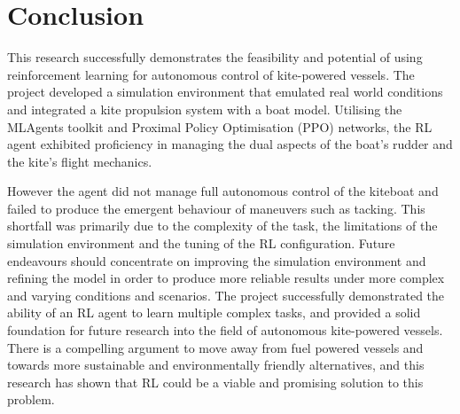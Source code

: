 \section{Conclusion}
This research successfully demonstrates the feasibility and potential of using reinforcement learning for autonomous control of kite-powered vessels. The project developed a simulation environment that emulated real world conditions and integrated a kite propulsion system with a boat model. Utilising the MLAgents toolkit and Proximal Policy Optimisation (PPO) networks, the RL agent exhibited proficiency in managing the dual aspects of the boat's rudder and the kite's flight mechanics.

However the agent did not manage full autonomous control of the kiteboat and failed to produce the emergent behaviour of maneuvers such as tacking. This shortfall was primarily due to the complexity of the task, the limitations of the simulation environment and the tuning of the RL configuration. Future endeavours should concentrate on improving the simulation environment and refining the model in order to produce more reliable results under more complex and varying conditions and scenarios. The project successfully demonstrated the ability of an RL agent to learn multiple complex tasks, and provided a solid foundation for future research into the field of autonomous kite-powered vessels. There is a compelling argument to move away from fuel powered vessels and towards more sustainable and environmentally friendly alternatives, and this research has shown that RL could be a viable and promising solution to this problem.



